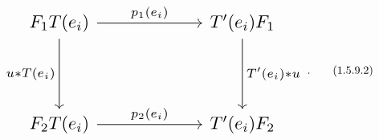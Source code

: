 \begin{equation}
  \resizebox{0.78\textwidth}{!}{%
    $\begin{tikzcd}[ampersand replacement=\&,column sep=6em,row sep=4em]
      F_1T(e_i)
        \arrow[r,"{p_1(e_i)}"]
        \arrow[d,"{u*T(e_i)}"']
        \& T'(e_i)F_1
          \arrow[d,"{T'(e_i)*u}"] \\
      F_2T(e_i)
        \arrow[r,"{p_2(e_i)}"]
        \& T'(e_i)F_2
    \end{tikzcd}$%
  }\;.
  \tag{1.5.9.2}
\end{equation}
